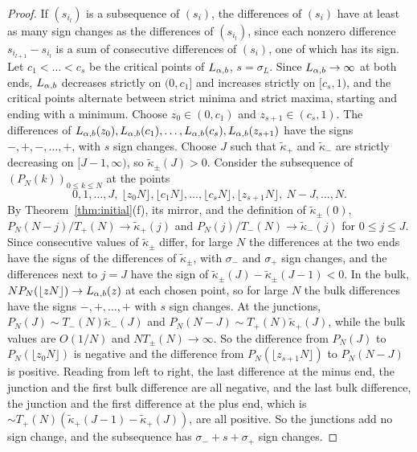 \begin{proof}
If $(s_{i_l})$ is a subsequence of $(s_i)$, the differences of $(s_i)$ have at least as many
sign changes as the differences of $(s_{i_l})$, since each nonzero difference
$s_{i_{l+1}}-s_{i_l}$ is a sum of consecutive differences of $(s_i)$, one of which has its
sign. Let $c_1<\dots<c_s$ be the critical points of $L_{\alpha,b}$, $s=\sigma_L$. Since $L_{\alpha,b}\to\infty$ at
both ends, $L_{\alpha,b}$ decreases strictly on $(0,c_1]$ and increases strictly on $[c_s,1)$, and the
critical points alternate between strict minima and strict maxima, starting and ending with
a minimum. Choose $z_0\in(0,c_1)$ and $z_{s+1}\in(c_s,1)$. The differences of
$L_{\alpha,b}(z_0),L_{\alpha,b}(c_1),\dots,L_{\alpha,b}(c_s),L_{\alpha,b}(z_{s+1})$ have the signs $-,+,-,\dots,+$, with $s$ sign
changes. Choose $J$ such that $\widetilde\kappa_\plus$ and $\widetilde\kappa_\minus$ are strictly
decreasing on $[J-1,\infty)$, so $\widetilde\kappa_\pm(J)>0$. Consider the subsequence of
$(P_N(k))_{0\le k\le N}$ at the points
\[
 0,1,\dots,J,\ \lfloor z_0N\rfloor,\lfloor c_1N\rfloor,\dots,\lfloor c_sN\rfloor,\lfloor z_{s+1}N\rfloor,\ N-J,\dots,N .
\]
By Theorem~\ref{thm:initial}(f), its mirror, and the definition of $\widetilde\kappa_\pm(0)$,
$P_N(N-j)/T_\plus(N)\to\widetilde\kappa_\plus(j)$ and $P_N(j)/T_\minus(N)\to\widetilde\kappa_\minus(j)$ for
$0\le j\le J$. Since consecutive values of $\widetilde\kappa_\pm$ differ, for large $N$ the
differences at the two ends have the signs of the differences of $\widetilde\kappa_\pm$, with
$\sigma_\minus$ and $\sigma_\plus$ sign changes, and the differences next to $j=J$ have the sign
of $\widetilde\kappa_\pm(J)-\widetilde\kappa_\pm(J-1)<0$. In the bulk, $NP_N(\lfloor zN\rfloor)\to L_{\alpha,b}(z)$ at
each chosen point, so for large $N$ the bulk differences have the signs $-,+,\dots,+$ with $s$
sign changes. At the junctions, $P_N(J)\sim T_\minus(N)\widetilde\kappa_\minus(J)$ and
$P_N(N-J)\sim T_\plus(N)\widetilde\kappa_\plus(J)$, while the bulk values are $O(1/N)$ and
$NT_\pm(N)\to\infty$. So the difference from $P_N(J)$ to $P_N(\lfloor z_0N\rfloor)$ is negative and
the difference from $P_N(\lfloor z_{s+1}N\rfloor)$ to $P_N(N-J)$ is positive. Reading from left to
right, the last difference at the minus end, the junction and the first bulk difference are
all negative, and the last bulk difference, the junction and the first difference at the plus
end, which is $\sim T_\plus(N)(\widetilde\kappa_\plus(J-1)-\widetilde\kappa_\plus(J))$, are all positive.
So the junctions add no sign change, and the subsequence has $\sigma_\minus+s+\sigma_\plus$ sign
changes.
\end{proof}

